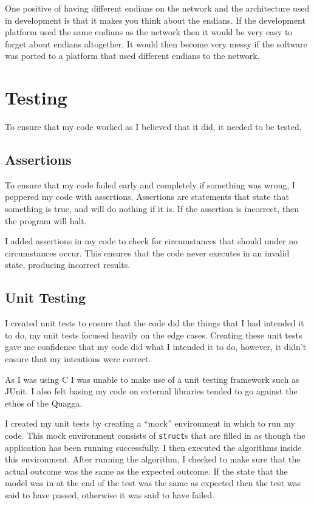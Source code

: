 \documentclass[12pt]{report}
\begin{document}
One positive of having different endians on the network and the architecture
used in development is that it makes you think about the endians. If the
development platform used the same endians as the network then it would be very
easy to forget about endians altogether. It would then become very messy if the
software was ported to a platform that used different endians to the network.
    
\chapter{Testing}
To ensure that my code worked as I believed that it did, it needed to be
tested. 

\section{Assertions}
To ensure that my code failed early and completely if something was wrong, I
peppered my code with assertions. Assertions are statements that state that
something is true, and will do nothing if it is. If the assertion is incorrect,
then the program will halt.

I added assertions in my code to check for circumstances that should under no
circumstances occur. This ensures that the code never executes in an invalid
state, producing incorrect results. 

\section{Unit Testing}
I created unit tests to ensure that the code did the things that I had intended
it to do, my unit tests focused heavily on the edge cases. Creating these unit
tests gave me confidence that my code did what I intended it to do, however, it
didn't ensure that my intentions were correct. 

As I was using C I was unable to make use of a unit testing framework such as
JUnit. I also felt basing my code on external libraries tended to go against
the ethos of the Quagga.

I created my unit tests by creating a ``mock'' environment in which to run my
code. This mock environment consists of \texttt{struct}s that are filled in as though
the application has been running successfully.  I then executed the algorithms
inside this environment. After running the algorithm, I checked to make sure
that the actual outcome was the same as the expected outcome. If the state that
the model was in at the end of the test was the same as expected then the test
was said to have passed, otherwise it was said to have failed. 
\end{document}
